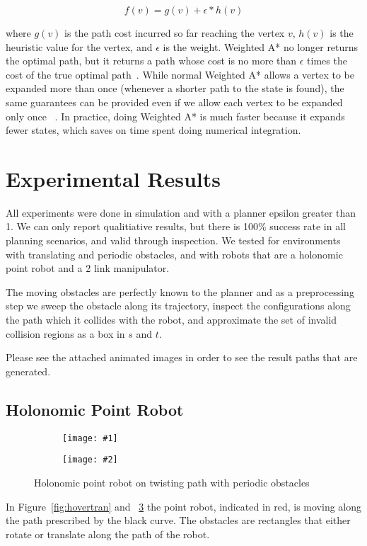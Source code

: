\documentclass[letterpaper,12pt]{article} %
\newcommand{\ffigdouble}[4]{
    \begin{figure}[h!]
    \centering

    \begin{subfigure}[t!]{0.48\linewidth}
    \texttt{[image: \#1]}
    \caption{}
    \label{fig:#4L}
    \end{subfigure}
    \begin{subfigure}[b!]{0.48\linewidth}
    \texttt{[image: \#2]}
    \caption{}
    \label{fig:#4R}
    \end{subfigure}

    \caption{#3}
    \label{fig:#4}
    \end{figure}
}
\begin{document}
\begin{equation}
f( v ) = g( v ) + \epsilon * h( v )
\end{equation}

where $g(v)$ is the path cost incurred so far reaching the vertex $v$, $h(v)$ is the heuristic value for the vertex, and $\epsilon$ is the weight. Weighted A* no longer returns the optimal path, but it returns a path whose cost is no more than $\epsilon$ times the cost of the true optimal path~\cite{Pohl-heursearch}. While normal Weighted A* allows a vertex to be expanded more than once (whenever a shorter path to the state is found), the same guarantees can be provided even if we allow each vertex to be expanded only once ~\cite{LikGorThr-ara}. In practice, doing Weighted A* is much faster because it expands fewer states, which saves on time spent doing numerical integration.

\section{Experimental Results}

All experiments were done in simulation and with a planner epsilon greater than 1. We can only report qualitiative results, but there is 100\% success rate in all planning scenarios, and valid through inspection. We tested for environments with translating and periodic obstacles, and with robots that are a holonomic point robot and a 2 link manipulator.

The moving obstacles are perfectly known to the planner and as a preprocessing step we sweep the obstacle along its trajectory, inspect the configurations along the path which it collides with the robot, and approximate the set of invalid collision regions as a box in $s$ and $t$.

Please see the attached animated images in order to see the result paths that are generated.

\subsection{Holonomic Point Robot}

\ffigdouble{pics/twist1}{pics/twist2}{Holonomic point robot on twisting path with periodic obstacles}{hovertwist}

In Figure~\ref{fig:hovertran} and ~\ref{fig:hovertwist} the point robot, indicated in red, is moving along the path prescribed by the black curve. The obstacles are rectangles that either rotate or translate along the path of the robot.
\end{document}
